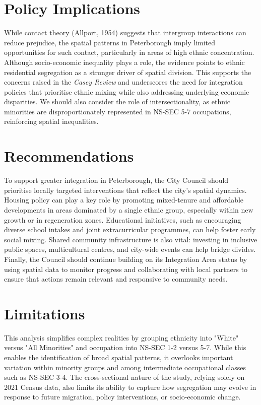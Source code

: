 \documentclass[10pt]{article}
\begin{document}
\begin{multicols}{2}
	\vspace{-1em}
	
	\section*{Policy Implications}
	\indent While contact theory (Allport, 1954) suggests that intergroup interactions can reduce prejudice, the spatial patterns in Peterborough imply limited opportunities for such contact, particularly in areas of high ethnic concentration. Although socio-economic inequality plays a role, the evidence points to ethnic residential segregation as a stronger driver of spatial division. This supports the concerns raised in the \textit{Casey Review} and underscores the need for integration policies that prioritise ethnic mixing while also addressing underlying economic disparities. We should also consider the role of intersectionality, as ethnic minorities are disproportionately represented in NS-SEC 5-7 occupations, reinforcing spatial inequalities.	
	
	\vspace{-1em}
		
	\section*{Recommendations}
	\indent To support greater integration in Peterborough, the City Council should prioritise locally targeted interventions that reflect the city's spatial dynamics. Housing policy can play a key role by promoting mixed-tenure and affordable developments in areas dominated by a single ethnic group, especially within new growth or in regeneration zones. Educational initiatives, such as encouraging diverse school intakes and joint extracurricular programmes, can help foster early social mixing. Shared community infrastructure is also vital: investing in inclusive public spaces, multicultural centres, and city-wide events can help bridge divides. Finally, the Council should continue building on its Integration Area status by using spatial data to monitor progress and collaborating with local partners to ensure that actions remain relevant and responsive to community needs.
	
	\vspace{-1em}
	
	\section*{Limitations}
	\indent This analysis simplifies complex realities by grouping ethnicity into "White" versus "All Minorities" and occupation into NS-SEC 1-2 versus 5-7. While this enables the identification of broad spatial patterns, it overlooks important variation within minority groups and among intermediate occupational classes such as NS-SEC 3-4. The cross-sectional nature of the study, relying solely on 2021 Census data, also limits its ability to capture how segregation may evolve in response to future migration, policy interventions, or socio-economic change.
	

\end{multicols}
\end{document}
